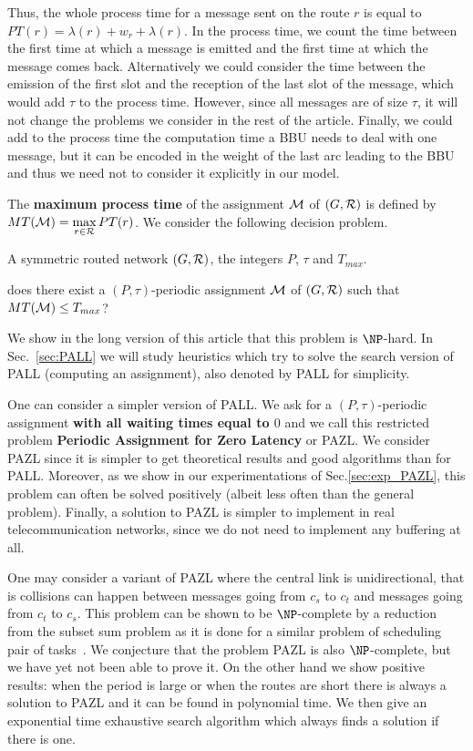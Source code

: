 \documentclass[10pt, conference, letterpaper]{IEEEtran}
\begin{document}
    
      Thus, the whole process time for a message sent on the route $r$ is equal to
      $PT(r)=\lambda(r)+ w_r+\lambda(r)$.      
      In the process time, we count the time between the first time at which a message is emitted and the first time at which the message comes back. Alternatively we could consider the time between the emission of the first slot and the reception of the last slot of the message, which would add $\tau$ to the process time.
      However, since all messages are of size $\tau$, it will not change the problems we consider in the rest of the article.
      Finally, we could add to the process time the computation time a BBU needs to deal with one message, but it can be encoded  in the weight of the last arc leading to the BBU and thus we need not to consider it explicitly in our model.
      
      
    The {\bf maximum process time} of the assignment ${\cal M}$ of $(G,{\cal R})$ is defined by $MT({\cal M})=\max\limits_{r \in {\cal R}} PT(r)$. We consider the following decision problem.


        A symmetric routed network $(G,{\cal R})$, the integers $P$, $\tau$ and $T_{max}$.

       does there exist a $(P,\tau)$-periodic assignment ${\cal M}$ of $(G,{\cal R})$ such that $MT({\cal M}) \leq T_{max}$?

     We show in the long version of this article that this problem is $\NP$-hard. 
      In Sec.~\ref{sec:PALL} we will study heuristics which try to solve the search version of PALL (computing an assignment), also denoted by PALL for simplicity.

One can consider a simpler version of PALL.
       We ask for a $(P,\tau)$-periodic assignment {\bf with all waiting times equal to $0$} and we call this restricted problem {\bf Periodic Assignment for Zero Latency} or PAZL. We consider PAZL since it is simpler to get theoretical results and good algorithms 
  than for PALL. Moreover, as we show in our experimentations of Sec.\ref{sec:exp_PAZL}, this problem can often be solved positively (albeit less often than the general problem). Finally, a solution to PAZL is simpler to implement in real telecommunication networks, since we do not need to implement any buffering at all.    
    
    One may consider a variant of PAZL where the central link is unidirectional, that is collisions can happen between messages going from $c_s$ to $c_t$ and messages  going from $c_t$ to $c_s$. This problem can be shown to be $\NP$-complete by a reduction from the subset sum problem as it is done for a similar problem of scheduling pair of tasks~\cite{orman1997complexity}. We conjecture that the problem PAZL is also $\NP$-complete,  but we have yet not been able to prove it.
  On the other hand we show positive results:  when the period is large or when the routes are short there is always a solution to PAZL and it can be found in polynomial time. We then give an exponential time exhaustive search algorithm which always finds a solution if there is one. 
  
\end{document}
